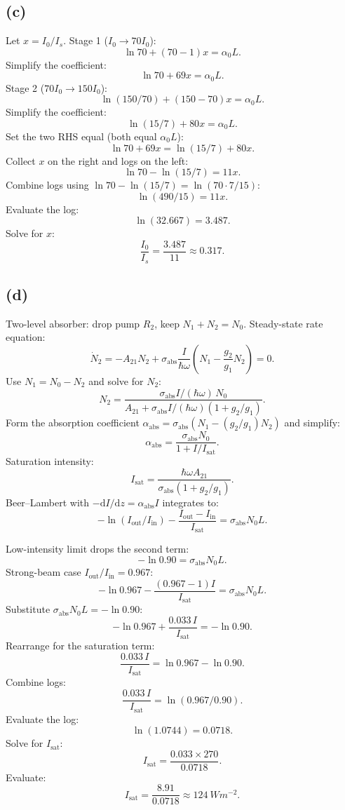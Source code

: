 \documentclass[11pt]{article}
\newcommand{\de}{\mathrm{d}}
\begin{document}
\subsection*{(c)}

Let $x=I_0/I_s$. Stage 1 ($I_0\to 70I_0$):
\[ \ln 70+(70-1)x=\alpha_0 L. \]
Simplify the coefficient:
\[ \ln 70+69 x=\alpha_0 L. \]
Stage 2 ($70I_0\to 150I_0$):
\[ \ln(150/70)+(150-70)x=\alpha_0 L. \]
Simplify the coefficient:
\[ \ln(15/7)+80 x=\alpha_0 L. \]
Set the two RHS equal (both equal $\alpha_0 L$):
\[ \ln 70+69 x=\ln(15/7)+80 x. \]
Collect $x$ on the right and logs on the left:
\[ \ln 70-\ln(15/7)=11 x. \]
Combine logs using $\ln 70-\ln(15/7)=\ln(70\cdot 7/15)$:
\[ \ln(490/15)=11 x. \]
Evaluate the log:
\[ \ln(32.667)=3.487. \]
Solve for $x$:
\[ \boxed{\;\frac{I_0}{I_s}=\frac{3.487}{11}\approx 0.317.\;} \]

\subsection*{(d)}

Two-level absorber: drop pump $R_2$, keep $N_1+N_2=N_0$. Steady-state rate equation:
\[ \dot N_2=-A_{21}N_2+\sigma_\text{abs}\frac{I}{\hbar\omega}\!\left(N_1-\frac{g_2}{g_1}N_2\right)=0. \]
Use $N_1=N_0-N_2$ and solve for $N_2$:
\[ N_2=\frac{\sigma_\text{abs} I/(\hbar\omega)\,N_0}{A_{21}+\sigma_\text{abs} I/(\hbar\omega)(1+g_2/g_1)}. \]
Form the absorption coefficient $\alpha_\text{abs}=\sigma_\text{abs}(N_1-(g_2/g_1)N_2)$ and simplify:
\[ \alpha_\text{abs}=\frac{\sigma_\text{abs}N_0}{1+I/I_\text{sat}}. \]
Saturation intensity:
\[ I_\text{sat}=\frac{\hbar\omega A_{21}}{\sigma_\text{abs}(1+g_2/g_1)}. \]
Beer--Lambert with $-\de I/\de z=\alpha_\text{abs}I$ integrates to:
\begin{equation}
-\ln(I_\text{out}/I_\text{in})-\frac{I_\text{out}-I_\text{in}}{I_\text{sat}}=\sigma_\text{abs}N_0 L.
\label{eq:absint}
\end{equation}

Low-intensity limit drops the second term:
\[ -\ln 0.90=\sigma_\text{abs}N_0 L. \]
Strong-beam case $I_\text{out}/I_\text{in}=0.967$:
\[ -\ln 0.967-\frac{(0.967-1)I}{I_\text{sat}}=\sigma_\text{abs}N_0 L. \]
Substitute $\sigma_\text{abs}N_0 L=-\ln 0.90$:
\[ -\ln 0.967+\frac{0.033\,I}{I_\text{sat}}=-\ln 0.90. \]
Rearrange for the saturation term:
\[ \frac{0.033\,I}{I_\text{sat}}=\ln 0.967-\ln 0.90. \]
Combine logs:
\[ \frac{0.033\,I}{I_\text{sat}}=\ln(0.967/0.90). \]
Evaluate the log:
\[ \ln(1.0744)=0.0718. \]
Solve for $I_\text{sat}$:
\[ I_\text{sat}=\frac{0.033\times 270}{0.0718}. \]
Evaluate:
\[ I_\text{sat}=\frac{8.91}{0.0718}\approx \SI{124}{W m^{-2}}. \]
\end{document}
